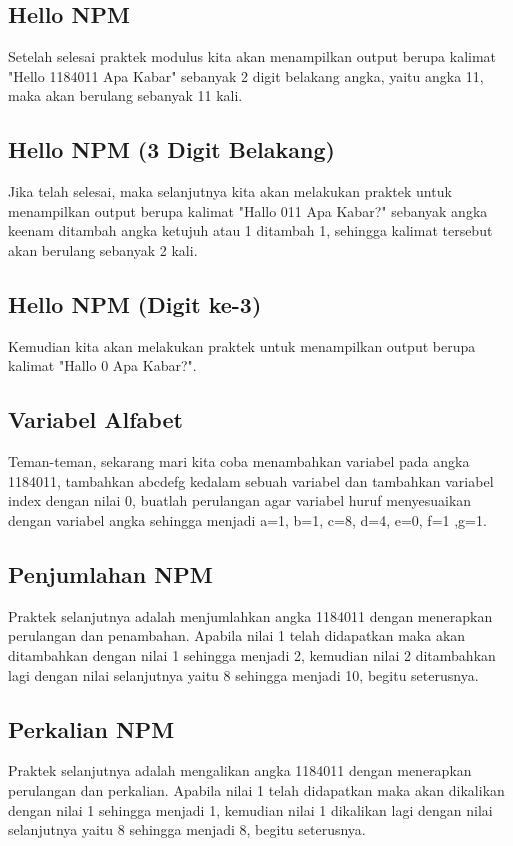 \subsection{Hello NPM}
Setelah selesai praktek modulus kita akan menampilkan output berupa kalimat "Hello 1184011 Apa Kabar" sebanyak 2 digit belakang angka, yaitu angka 11, maka akan berulang sebanyak 11 kali.

\subsection{Hello NPM (3 Digit Belakang)}
Jika telah selesai, maka selanjutnya kita akan melakukan praktek untuk menampilkan output berupa kalimat "Hallo 011 Apa Kabar?" sebanyak angka keenam ditambah angka ketujuh atau 1 ditambah 1, sehingga kalimat tersebut akan berulang sebanyak 2 kali.

\subsection{Hello NPM (Digit ke-3)}
Kemudian kita akan melakukan praktek untuk menampilkan output berupa kalimat "Hallo 0 Apa Kabar?".

\subsection{Variabel Alfabet}
Teman-teman, sekarang mari kita coba menambahkan variabel pada angka 1184011, tambahkan abcdefg kedalam sebuah variabel dan tambahkan variabel index dengan nilai 0, buatlah perulangan agar variabel huruf menyesuaikan dengan variabel angka sehingga menjadi a=1, b=1, c=8, d=4, e=0, f=1 ,g=1.

\subsection{Penjumlahan NPM}
Praktek selanjutnya adalah menjumlahkan angka 1184011 dengan menerapkan perulangan dan penambahan. Apabila nilai 1 telah didapatkan maka akan ditambahkan dengan nilai 1 sehingga menjadi 2, kemudian nilai 2 ditambahkan lagi dengan nilai selanjutnya yaitu 8 sehingga menjadi 10, begitu seterusnya.

\subsection{Perkalian NPM}
Praktek selanjutnya adalah mengalikan angka 1184011 dengan menerapkan perulangan dan perkalian. Apabila nilai 1 telah didapatkan maka akan dikalikan dengan nilai 1 sehingga menjadi 1, kemudian nilai 1 dikalikan lagi dengan nilai selanjutnya yaitu 8 sehingga menjadi 8, begitu seterusnya.

